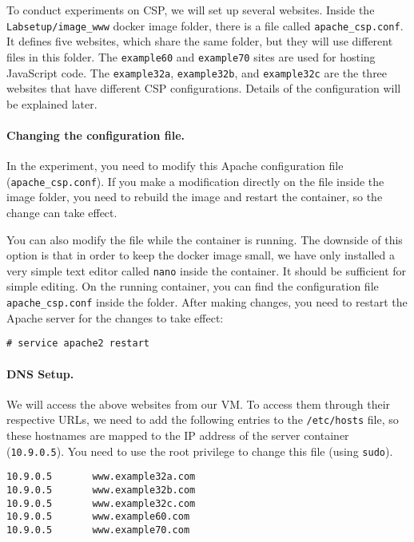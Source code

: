 To conduct experiments on CSP, we will set up several websites. 
Inside the \texttt{Labsetup/image\_www} docker image folder, 
there is a file called \texttt{apache\_csp.conf}.
It defines five websites, which share the same folder, but
they will use different files in this folder. 
The \texttt{example60} and \texttt{example70} sites are 
used for hosting JavaScript code.  The 
\texttt{example32a}, \texttt{example32b}, and 
\texttt{example32c} are the three websites that 
have different CSP configurations. Details of the configuration 
will be explained later.


\paragraph{Changing the configuration file.}
In the experiment, you need to modify this Apache 
configuration file (\texttt{apache\_csp.conf}). If you make a modification
directly on the file inside the image folder, you need to rebuild the image
and restart the container, so the change can take effect. 

You can also modify the file while the container is running. 
The downside of this 
option is that in order to keep the docker image small, 
we have only installed a very simple text editor called \texttt{nano} 
inside the container. It should be sufficient for simple editing.   
On the running container, you can find the configuration
file \texttt{apache\_csp.conf} inside the 
 folder.  
After making changes, you need to restart the Apache server for the 
changes to take effect:

\begin{lstlisting}
# service apache2 restart
\end{lstlisting}


\paragraph{DNS Setup.}
We will access the above websites from our VM. 
To access them through their respective URLs, 
we need to add the following entries to the 
\texttt{/etc/hosts} file, so these hostnames are mapped to 
the IP address of the server container (\texttt{10.9.0.5}). 
You need to use the root privilege to 
change this file (using \texttt{sudo}).

\begin{lstlisting}
10.9.0.5       www.example32a.com
10.9.0.5       www.example32b.com
10.9.0.5       www.example32c.com
10.9.0.5       www.example60.com
10.9.0.5       www.example70.com
\end{lstlisting}


